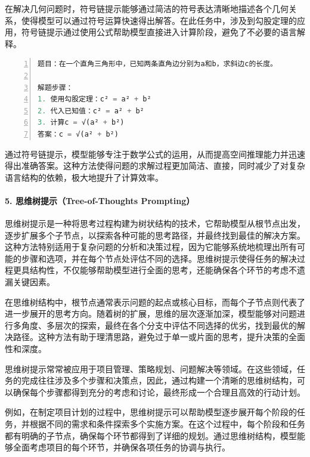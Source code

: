 在解决几何问题时，符号链提示能够通过简洁的符号表达清晰地描述各个几何关系，使得模型可以通过符号运算快速得出解答。在此任务中，涉及到勾股定理的应用，符号链提示通过使用公式帮助模型直接进入计算阶段，避免了不必要的语言解释。



\begin{lstlisting}[language={python},label={},caption={}, basicstyle=\footnotesize\ttfamily, breaklines=true, numbers=left, frame=single]
题目：在一个直角三角形中，已知两条直角边分别为a和b，求斜边c的长度。

解题步骤：
1. 使用勾股定理：c² = a² + b²
2. 代入已知值：c² = a² + b²
3. 计算c = √(a² + b²)
答案：c = √(a² + b²)
\end{lstlisting}

通过符号链提示，模型能够专注于数学公式的运用，从而提高空间推理能力并迅速得出准确答案。这种方法使得问题的求解过程更加简洁、直接，同时减少了对复杂语言结构的依赖，极大地提升了计算效率。

\paragraph{5. 思维树提示（Tree-of-Thoughts Prompting）} 

思维树提示是一种将思考过程构建为树状结构的技术，它帮助模型从根节点出发，逐步扩展多个子节点，以探索各种可能的思考路径，并最终找到最佳的解决方案。这种方法特别适用于复杂问题的分析和决策过程，因为它能够系统地梳理出所有可能的步骤和选项，并在每个节点处评估不同的选择。思维树提示使得任务的解决过程更具结构性，不仅能够帮助模型进行全面的思考，还能确保各个环节的考虑不遗漏关键因素。

在思维树结构中，根节点通常表示问题的起点或核心目标，而每个子节点则代表了进一步展开的思考方向。随着树的扩展，思维的层次逐渐加深，模型能够对问题进行多角度、多层次的探索，最终在各个分支中评估不同选择的优劣，找到最优的解决路径。这种方法有助于理清思路，避免过于单一或片面的思考，提升决策的全面性和深度。

思维树提示常常被应用于项目管理、策略规划、问题解决等领域。在这些领域，任务的完成往往涉及多个步骤和决策点，因此，通过构建一个清晰的思维树结构，可以确保每个步骤都得到充分的考虑和讨论，最终形成一个合理且高效的行动计划。

例如，在制定项目计划的过程中，思维树提示可以帮助模型逐步展开每个阶段的任务，并根据不同的需求和条件探索多个实施方案。在这个过程中，每个阶段和任务都有明确的子节点，确保每个环节都得到了详细的规划。通过思维树结构，模型能够全面考虑项目的每个环节，并确保各项任务的协调与执行。



